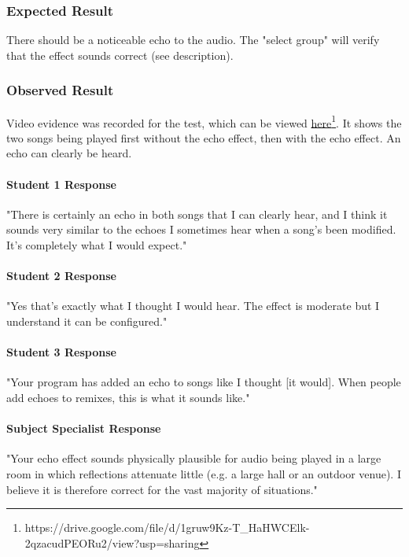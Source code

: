 \subsubsection{Expected Result}
There should be a noticeable echo to the audio. The "select group" will verify that the effect sounds correct (see description).

\subsubsection{Observed Result}
\label{sec:evidence4.1}
Video evidence was recorded for the test, which can be viewed \href{https://drive.google.com/file/d/1gruw9Kz-T_HaHWCElk-2qzacudPEORu2/view?usp=sharing}{here}\footnote{
	https://drive.google.com/file/d/1gruw9Kz-T\_HaHWCElk-2qzacudPEORu2/view?usp=sharing
}. It shows the two songs being played first without the echo effect, then with the echo effect. An echo can clearly be heard.

\paragraph{Student 1 Response}
"There is certainly an echo in both songs that I can clearly hear, and I think it sounds very similar to the echoes I sometimes hear when a song's been modified. It's completely what I would expect."

\paragraph{Student 2 Response}
"Yes that's exactly what I thought I would hear. The effect is moderate but I understand it can be configured."

\paragraph{Student 3 Response}
"Your program has added an echo to songs like I thought [it would]. When people add echoes to remixes, this is what it sounds like." 

\paragraph{Subject Specialist Response}
"Your echo effect sounds physically plausible for audio being played in a large room in which reflections attenuate little (e.g. a large hall or an outdoor venue). I believe it is therefore correct for the vast majority of situations."


